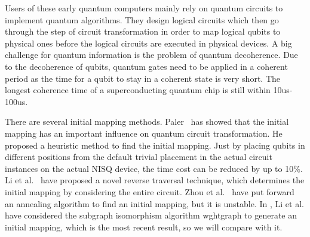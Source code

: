 \documentclass[journal]{IEEEtran}
\begin{document}
Users of these early quantum computers mainly rely on quantum circuits to implement quantum algorithms. They design logical circuits which then go through the step of circuit transformation in order to map logical qubits to physical ones before the logical circuits are executed in physical devices. A big challenge for quantum information is the problem of quantum decoherence. Due to the decoherence of qubits, quantum gates need to be applied in a coherent period as the time for a qubit to stay in a coherent state is very short. The longest coherence time of a superconducting quantum chip is still within 10us-100us. 

There are several initial mapping methods. Paler~\cite{Paler2018} has showed that the initial mapping has an important influence on quantum circuit transformation. He proposed a heuristic method to find the initial mapping. Just by placing qubits in different positions from the default trivial placement
 in the actual circuit instances on the actual NISQ device, the time cost can be reduced by up to 10\%. Li et al.~\cite{Li2018} have proposed a novel reverse traversal technique, which determines the initial mapping by considering the entire circuit. Zhou et al.~\cite{Xiangzhen2020} have put forward an annealing algorithm to find an initial mapping, but it is unstable. In \cite{2020Qubit}, Li et al. have considered the subgraph isomorphism algorithm wghtgraph to generate an initial mapping, which is the most recent result, so we will compare with it.
\end{document}

